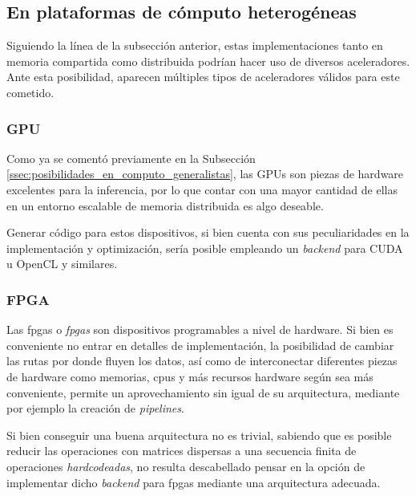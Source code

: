 \subsection{En plataformas de cómputo heterogéneas}
\label{ssec:posibilidades_en_computo_heterogeneas}
Siguiendo la línea de la subsección anterior, estas implementaciones tanto en memoria compartida como distribuida podrían hacer uso de diversos aceleradores. Ante esta posibilidad, aparecen múltiples tipos de aceleradores válidos para este cometido.

\subsubsection{GPU}
\label{sssec:heterogeneas_gpu}
Como ya se comentó previamente en la Subsección \ref{ssec:posibilidades_en_computo_generalistas}, las GPUs son piezas de hardware excelentes para la inferencia, por lo que contar con una mayor cantidad de ellas en un entorno escalable de memoria distribuida es algo deseable.

Generar código para estos dispositivos, si bien cuenta con sus peculiaridades en la implementación y optimización, sería posible empleando un \textit{backend} para CUDA u OpenCL y similares.

\subsubsection{FPGA}
\label{sssec:heterogeneas_fpga}
Las \acrshort{fpga}s o \textit{\acrlong{fpga}s} son dispositivos programables a nivel de hardware. Si bien es conveniente no entrar en detalles de implementación, la posibilidad de cambiar las rutas por donde fluyen los datos, así como de interconectar diferentes piezas de hardware como memorias, \acrshort{cpu}s y más recursos hardware según sea más conveniente, permite un aprovechamiento sin igual de su arquitectura, mediante por ejemplo la creación de \textit{pipelines}.

Si bien conseguir una buena arquitectura no es trivial, sabiendo que es posible reducir las operaciones con matrices dispersas a una secuencia finita de operaciones \textit{hardcodeadas}, no resulta descabellado pensar en la opción de implementar dicho \textit{backend} para \acrshort{fpga}s mediante una arquitectura adecuada.

